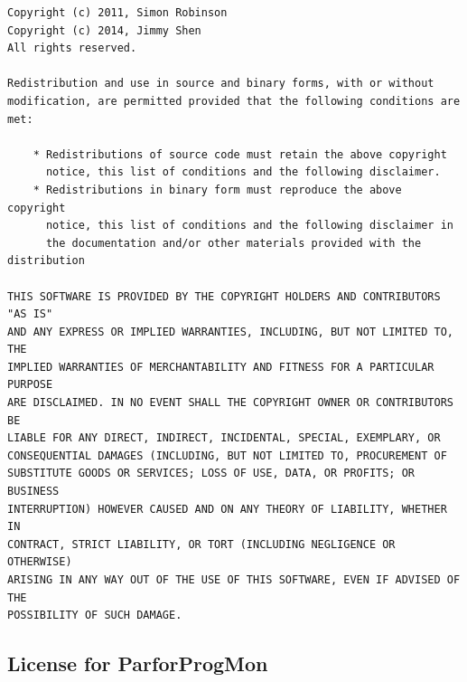 \documentclass[a4paper, oneside, onecolumn, 11pt]{article}
\begin{document}
\begingroup
\footnotesize
\begin{verbatim}
Copyright (c) 2011, Simon Robinson
Copyright (c) 2014, Jimmy Shen
All rights reserved.

Redistribution and use in source and binary forms, with or without
modification, are permitted provided that the following conditions are
met:

    * Redistributions of source code must retain the above copyright
      notice, this list of conditions and the following disclaimer.
    * Redistributions in binary form must reproduce the above copyright
      notice, this list of conditions and the following disclaimer in
      the documentation and/or other materials provided with the distribution

THIS SOFTWARE IS PROVIDED BY THE COPYRIGHT HOLDERS AND CONTRIBUTORS "AS IS"
AND ANY EXPRESS OR IMPLIED WARRANTIES, INCLUDING, BUT NOT LIMITED TO, THE
IMPLIED WARRANTIES OF MERCHANTABILITY AND FITNESS FOR A PARTICULAR PURPOSE
ARE DISCLAIMED. IN NO EVENT SHALL THE COPYRIGHT OWNER OR CONTRIBUTORS BE
LIABLE FOR ANY DIRECT, INDIRECT, INCIDENTAL, SPECIAL, EXEMPLARY, OR
CONSEQUENTIAL DAMAGES (INCLUDING, BUT NOT LIMITED TO, PROCUREMENT OF
SUBSTITUTE GOODS OR SERVICES; LOSS OF USE, DATA, OR PROFITS; OR BUSINESS
INTERRUPTION) HOWEVER CAUSED AND ON ANY THEORY OF LIABILITY, WHETHER IN
CONTRACT, STRICT LIABILITY, OR TORT (INCLUDING NEGLIGENCE OR OTHERWISE)
ARISING IN ANY WAY OUT OF THE USE OF THIS SOFTWARE, EVEN IF ADVISED OF THE
POSSIBILITY OF SUCH DAMAGE.
\end{verbatim}
\endgroup

\subsection{License for ParforProgMon}
\end{document}
